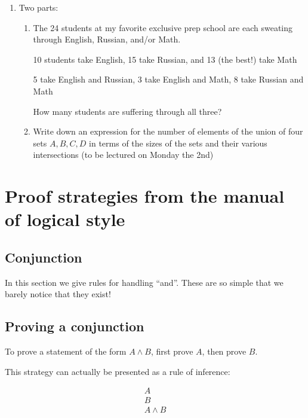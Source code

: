 \documentclass[12pt]{article}
\begin{document}
\begin{enumerate}
\begin{enumerate}
\end{enumerate}

\newpage

\item  Two parts:

\begin{enumerate}
\item The 24 students at my favorite exclusive prep school are each sweating through English, Russian, and/or Math.

10 students take English, 15 take Russian, and 13 (the best!) take Math

5 take English and Russian, 3 take English and Math, 8 take Russian and Math

How many students are suffering through all three?

\item Write down an expression for the number of elements of the union of four sets $A,B,C,D$ in terms of the sizes of the sets and their various intersections (to be lectured on Monday the 2nd)

\end{enumerate}

\end{enumerate}

\newpage

\section{Proof strategies from the manual of logical style}

\subsection{Conjunction}

In this section we give rules for handling ``and''.  These are so simple that we barely notice that they exist!

\subsection{Proving a conjunction}

To prove a statement of the form $A \wedge B$, first prove $A$, then prove
$B$.

This strategy can actually be presented as a rule of inference:

$$\begin{array}{l} A \\ B \\ \hline A \wedge B \end{array}$$
\end{document}
